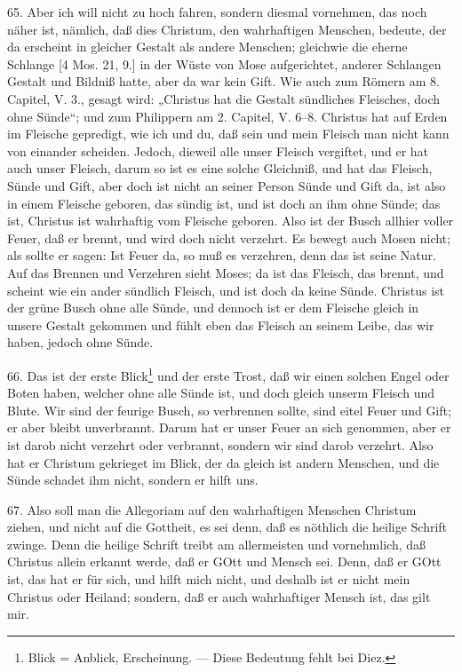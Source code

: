 65. Aber ich will nicht zu hoch fahren, sondern diesmal vornehmen, das noch näher ist, nämlich, daß dies Christum, den wahrhaftigen Menschen, bedeute, der da erscheint in gleicher Gestalt als andere Menschen; gleichwie die eherne Schlange [4 Mos. 21, 9.] in der Wüste von Mose aufgerichtet, anderer Schlangen Gestalt und Bildniß hatte, aber da war kein Gift. Wie auch zum Römern am 8. Capitel, V. 3., gesagt wird: „Christus hat die Gestalt sündliches Fleisches, doch ohne Sünde“; und zum Philippern am 2. Capitel, V. 6–8. Christus hat auf Erden im Fleische gepredigt, wie ich und du, daß sein und mein Fleisch man nicht kann von einander scheiden. Jedoch, dieweil alle unser Fleisch vergiftet, und er hat auch unser Fleisch, darum so ist es eine solche Gleichniß, und hat das Fleisch, Sünde und Gift, aber doch ist nicht an seiner Person Sünde und Gift da, ist also in einem Fleische geboren, das sündig ist, und ist doch an ihm ohne Sünde; das ist, Christus ist wahrhaftig vom Fleische geboren. Also ist der Busch allhier voller Feuer, daß er brennt, und wird doch nicht verzehrt. Es bewegt auch Mosen nicht; als sollte er sagen: Ist Feuer da, so muß es verzehren, denn das ist seine Natur. Auf das Brennen und Verzehren sieht Moses; da ist das Fleisch, das brennt, und scheint wie ein ander sündlich Fleisch, und ist doch da keine Sünde. Christus ist der grüne Busch ohne alle Sünde, und dennoch ist er dem Fleische gleich in unsere Gestalt gekommen und fühlt eben das Fleisch an seinem Leibe, das wir haben, jedoch ohne Sünde.

66. Das ist der erste Blick\footnote{Blick = Anblick, Erscheinung. — Diese Bedeutung fehlt bei Diez.} und der erste Trost, daß wir einen solchen Engel oder Boten haben, welcher ohne alle Sünde ist, und doch gleich unserm Fleisch und Blute. Wir sind der feurige Busch, so verbrennen sollte, sind eitel Feuer und Gift; er aber bleibt unverbrannt. Darum hat er unser Feuer an sich genommen, aber er ist darob nicht verzehrt oder verbrannt, sondern wir sind darob verzehrt. Also hat er Christum gekrieget im Blick, der da gleich ist andern Menschen, und die Sünde schadet ihm nicht, sondern er hilft uns.

67. Also soll man die Allegoriam auf den wahrhaftigen Menschen Christum ziehen, und nicht auf die Gottheit, es sei denn, daß es nöthlich die heilige Schrift zwinge. Denn die heilige Schrift treibt am allermeisten und vornehmlich, daß Christus allein erkannt werde, daß er GOtt und Mensch sei. Denn, daß er GOtt ist, das hat er für sich, und hilft mich nicht, und deshalb ist er nicht mein Christus oder Heiland; sondern, daß er auch wahrhaftiger Mensch ist, das gilt mir.

